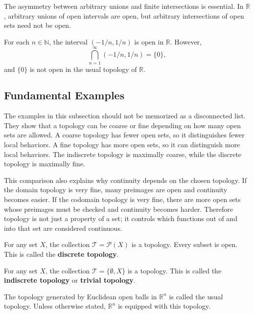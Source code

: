 The asymmetry between arbitrary unions and finite intersections is essential. In $\mathbb{R}$, arbitrary unions of open intervals are open, but arbitrary intersections of open sets need not be open.

\begin{example}
For each $n\in\mathbb{N}$, the interval $(-1/n,1/n)$ is open in $\mathbb{R}$. However,
\[
    \bigcap_{n=1}^{\infty}(-1/n,1/n)=\{0\},
\]
and $\{0\}$ is not open in the usual topology of $\mathbb{R}$.
\end{example}

\subsection{Fundamental Examples}


The examples in this subsection should not be memorized as a disconnected list. They show that a topology can be coarse or fine depending on how many open sets are allowed. A coarse topology has fewer open sets, so it distinguishes fewer local behaviors. A fine topology has more open sets, so it can distinguish more local behaviors. The indiscrete topology is maximally coarse, while the discrete topology is maximally fine.

This comparison also explains why continuity depends on the chosen topology. If the domain topology is very fine, many preimages are open and continuity becomes easier. If the codomain topology is very fine, there are more open sets whose preimages must be checked and continuity becomes harder. Therefore topology is not just a property of a set; it controls which functions out of and into that set are considered continuous.

\begin{example}
For any set $X$, the collection $\mathcal{T}=\mathcal{P}(X)$ is a topology. Every subset is open. This is called the \textbf{discrete topology}.
\end{example}

\begin{example}
For any set $X$, the collection $\mathcal{T}=\{\emptyset,X\}$ is a topology. This is called the \textbf{indiscrete topology} or \textbf{trivial topology}.
\end{example}

\begin{example}
The topology generated by Euclidean open balls in $\mathbb{R}^n$ is called the usual topology. Unless otherwise stated, $\mathbb{R}^n$ is equipped with this topology.
\end{example}

